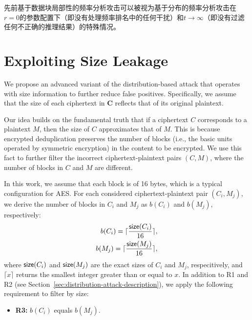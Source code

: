 先前基于数据块局部性的频率分析攻击\cite{li2017information}可以被视为基于分布的频率分析攻击在$r=0$的参数配置下（即没有处理频率排名中的任何干扰）和$t \rightarrow \infty$（即没有过滤任何不正确的推理结果）的特殊情况。

\section{Exploiting Size Leakage}

We propose an advanced variant of the distribution-based attack that operates with size information to further reduce false positives. Specifically, we assume that the size of each ciphertext in $\mathbf{C}$ reflects that of its original plaintext.   



Our idea builds on the fundamental truth that if a ciphertext $C$ corresponds to a plaintext $M$, then the size of $C$ approximates that of $M$. This is because encrypted deduplication preserves the number of blocks (i.e., the basic units operated by symmetric encryption) in the content to be encrypted. We use this fact to further filter the incorrect ciphertext-plaintext pairs $(C, M)$, where the number of blocks in $C$ and $M$ are different.  



In this work, we assume that each block is of 16 bytes, which is a typical configuration for AES. For each considered ciphertext-plaintext pair $(C_i, M_j)$, we derive the number of blocks in $C_i$ and $M_j$ as $b({C_i})$ and $b({M_j})$, respectively:
\begin{eqnarray*}
b({C_i}) = \lceil \frac{{\sf size}(C_i)}{16} \rceil, \nonumber \\
b({M_j}) = \lceil \frac{{\sf size}(M_j)}{16} \rceil, \nonumber 
\end{eqnarray*}
where ${\sf size}(C_i)$ and ${\sf size}(M_j)$ are the exact sizes of $C_i$ and $M_j$, respecitively, and $\lceil x \rceil$ returns the smallest integer greater than or equal to $x$. In addition to R1 and R2 (see Section~\ref{sec:distribution-attack-description}), we apply the following requirement to filter by size:    
\begin{itemize}[leftmargin=*]
    \item {\bf R3:} $b({C_i})$ equals $b({M_j})$.
\end{itemize}

